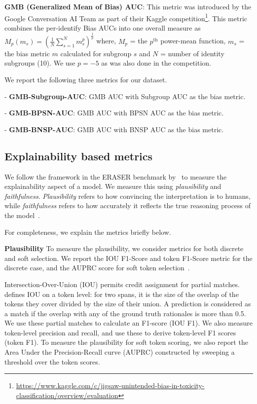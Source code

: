 \documentclass[letterpaper]{article} \usepackage{aaai21}  \usepackage{times}  \usepackage{helvet} \usepackage{courier}  \usepackage[hyphens]{url}  \usepackage{graphicx} \urlstyle{rm} \def\UrlFont{\rm}  \usepackage{natbib}  \usepackage{caption}
\begin{document}
\noindent\textbf{GMB (Generalized Mean of Bias) AUC}: This metric was introduced by the Google Conversation AI Team as part of their Kaggle competition\footnote{\url{https://www.kaggle.com/c/jigsaw-unintended-bias-in-toxicity-classification/overview/evaluation}}. This metric combines the per-identify Bias AUCs into one overall measure as $M _ { p } \left( m _ { s } \right) = \left( \frac { 1 } { N } \sum _ { s = 1 } ^ { N } m _ { s } ^ { p } \right) ^ { \frac { 1 } { p } }
$ where, $M_p$  = the $p^\textrm{th}$ power-mean function, $m_s$ = the bias metric $m$ calculated for subgroup $s$ and
$N$ = number of identity subgroups (10). We use $p=-5$ as was also done in the competition.



\noindent We report the following three metrics for our dataset.
\begin{compactitem}
    \item[-] \textbf{GMB-Subgroup-AUC}: GMB AUC with Subgroup AUC as the bias metric.
    \item[-] \textbf{GMB-BPSN-AUC}: GMB AUC with BPSN AUC as the bias metric.
    \item[-] \textbf{GMB-BNSP-AUC}: GMB AUC with BNSP AUC as the bias metric.
\end{compactitem}






\subsection{Explainability based metrics}

We follow the framework in the ERASER benchmark by~\citet{deyoung2019eraser} to measure the explainability aspect of a model. We measure this using \textit{plausibility} and \textit{faithfulness}. \textit{Plausibility} refers to how convincing the interpretation is to humans,  while \textit{faithfulness} refers to how accurately it reflects the true reasoning process of the model~\cite{jacovi2020towards}.



For completeness, we explain the metrics briefly below.

\noindent\textbf{Plausibility}
To measure the plausibility, we consider metrics for both discrete and soft selection. We report the IOU F1-Score and token F1-Score metric for the discrete case, and the AUPRC score for soft token selection~\cite{deyoung2019eraser}. 

Intersection-Over-Union (IOU) permits credit assignment for partial matches.  \citet{deyoung2019eraser} defines IOU on a token level: for two spans, it is the size of the overlap of the tokens they cover divided by the size of their union. A prediction is considered as a match if the overlap with any of the ground truth rationales is more than 0.5. We use these partial matches to calculate an F1-score (IOU F1). We also measure token-level precision and recall, and use these to derive token-level F1 scores (token F1). To measure the plausibility for soft token scoring,
 we also report the Area Under the Precision-Recall curve (AUPRC) constructed by sweeping a threshold over the token scores.
\end{document}
